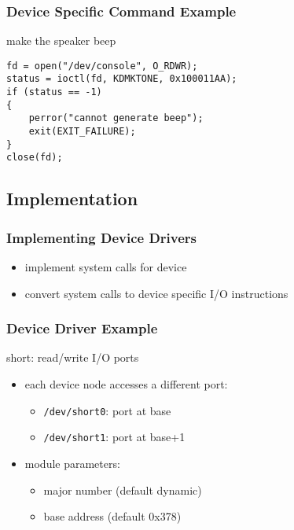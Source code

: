 \documentclass[dvipsnames]{beamer}
\begin{document}
\begin{frame}[fragile]
  \frametitle{Device Specific Command Example}

  \begin{exampleblock}{make the speaker beep}
    \begin{lstlisting}
fd = open("/dev/console", O_RDWR);
status = ioctl(fd, KDMKTONE, 0x100011AA);
if (status == -1)
{
    perror("cannot generate beep");
    exit(EXIT_FAILURE);
}
close(fd);
    \end{lstlisting}
  \end{exampleblock}
\end{frame}

\subsection{Implementation}

\begin{frame}
  \frametitle{Implementing Device Drivers}

  \begin{itemize}
    \item implement system calls for device
    \item convert system calls to device specific I/O instructions
  \end{itemize}
\end{frame}

\begin{frame}
  \frametitle{Device Driver Example}

  \begin{exampleblock}{short: read/write I/O ports}
    \begin{itemize}
      \item each device node accesses a different port:
      \begin{itemize}
        \item \texttt{/dev/short0}: port at base
        \item \texttt{/dev/short1}: port at base+1
      \end{itemize}

      \pause
      \medskip
      \item module parameters:
      \begin{itemize}
        \item major number (default dynamic)
        \item base address (default 0x378)
      \end{itemize}
    \end{itemize}
  \end{exampleblock}
\end{frame}
\end{document}
